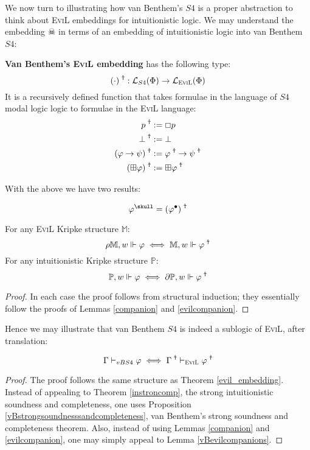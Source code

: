 We now turn to illustrating how van Benthem's $S4$ is a proper
abstraction to think about \textsc{EviL} embeddings for intuitionistic
logic.  We may understand the embedding $\skull$ in terms of an
embedding of intuitionistic logic into van
Benthem $S4$:
\begin{definition}
\textbf{Van Benthem's \textsc{EviL} embedding} has the following type: $$(\cdot)^\Ankh :
\mathcal{L}_{S4}(\Phi) \to \mathcal{L}_{\textsc{EviL}}(\Phi)$$ It is a recursively
defined function that takes formulae in the language of $S4$ modal logic
logic to formulae in the \textsc{EviL} language: 
\begin{align*}
  p^\Ankh & := \Box p \\
  \bot^\Ankh & := \bot \\
  (\phi \to \psi)^\Ankh & := \phi^\Ankh \to \psi^\Ankh \\
(\BP \phi)^\Ankh & := \BP \phi^\Ankh
\end{align*}
\end{definition}
With the above we have two results:
\begin{proposition}
$$\phi^\skull = (\phi^\bullet)^\Ankh$$
\end{proposition}
\begin{lemma}\label{vBevilcompanions}
For any \textsc{EviL} Kripke structure $\mathbb{M}$:
$$\rho \mathbb{M},w \Vdash \phi \iff 
\mathbb{M},w \Vdash \phi^\Ankh$$
For any intuitionistic Kripke structure $\mathbb{P}$:
$$\mathbb{P},w \Vdash \phi \iff \partial \mathbb{P},w \Vdash \phi^\Ankh$$
\end{lemma}
\begin{proof}
In each case the proof follows from structural induction; they
essentially follow the proofs of Lemmas \ref{companion} and \ref{evilcompanion}.  
\end{proof}
Hence we may illustrate that van Benthem $S4$ is indeed a sublogic of
\textsc{EviL}, after translation:

\begin{theorem}\label{evil_embedding_2}
$$ \Gamma \vdash_{vBS4} \phi \iff \Gamma^\Ankh \vdash_{\textsc{EviL}}\phi^\Ankh $$
\end{theorem}
\begin{proof}
The proof follows the same structure as Theorem \ref{evil_embedding}.
Instead of appealing to Theorem \ref{instroncomp}, the strong
intuitionistic soundness and completeness, one uses Proposition
\ref{vBstrongsoundnesssandcompleteness}, van Benthem's
strong soundness and completeness theorem. 
Also, instead of using Lemmas \ref{companion} and \ref{evilcompanion},
one may simply appeal to Lemma \ref{vBevilcompanions}.
\end{proof}


